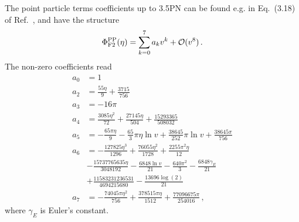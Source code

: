 \documentclass[prd,aps,letter,twocolumn,floatfix,notitlepage,nofootinbib]{revtex4-1}
\newcommand{\be}{\begin{equation}}
\newcommand{\ee}{\end{equation}}
\begin{document}
The point particle terms coefficients up to 3.5PN can be found e.g. in Eq.~(3.18) of Ref.~\cite{BuonannoIyerOchsner2009}, and have the structure
\be
	\Phi_{\rm F2}^{\rm PP}(\eta) = \sum_{k=0}^{7} a_{k} v^{k} + \mathcal{O}(v^{8}) \,.
\ee
The non-zero coefficients read
\begin{align}
	a_{0} &= 1 \nonumber\\
	a_{2} &= \frac{55 \eta }{9}+\frac{3715}{756} \nonumber\\
	a_{3} &= -16 \pi \nonumber\\
	a_{4} &= \frac{3085 \eta ^2}{72}+\frac{27145 \eta }{504}+\frac{15293365}{508032} \nonumber\\
	a_{5} &= -\frac{65 \pi  \eta }{9}-\frac{65}{3} \pi  \eta   \ln v +\frac{38645}{252} \pi   \ln v +\frac{38645 \pi }{756} \nonumber\\
	a_{6} &= -\frac{127825 \eta ^3}{1296}+\frac{76055 \eta ^2}{1728}+\frac{2255 \pi ^2 \eta }{12} \nonumber\\ 
	& -\frac{15737765635 \eta }{3048192}-\frac{6848  \ln v }{21}-\frac{640 \pi ^2}{3}-\frac{6848 \gamma_{E} }{21} \nonumber\\ 
	& +\frac{11583231236531}{4694215680}-\frac{13696 \log (2)}{21} \nonumber\\
	a_{7} &= -\frac{74045 \pi  \eta ^2}{756}+\frac{378515 \pi  \eta }{1512}+\frac{77096675 \pi }{254016} \,,
\end{align}
where $\gamma_{E}$ is Euler's constant.
\end{document}
